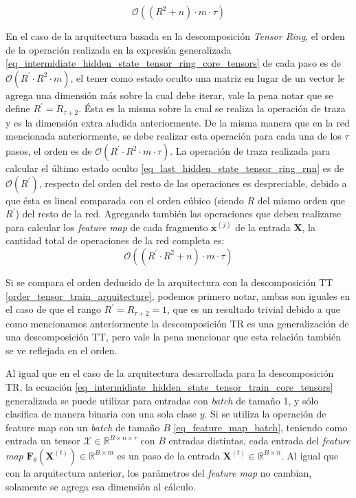 \documentclass[spanish]{article}
\theoremstyle{definition}
\theoremstyle{remark}
\numberwithin{equation}{section}
\numberwithin{equation}{section} %
\begin{document}
\begin{equation}
\label{order_tensor_train_arquitecture}
\mathcal{O}( (R^2 + n) \cdot m \cdot \tau)
\end{equation} \par
En el caso de la arquitectura  basada en la descomposición \textit{Tensor Ring}, el orden de la operación realizada en la expresión generalizada  \eqref{eq_intermidiate_hidden_state_tensor_ring_core_tensors}
de cada paso es de $\mathcal{O}(R^\prime \cdot R^2 \cdot m)$, el tener como estado oculto una matriz en lugar de un vector le agrega una dimensión más sobre la cual debe iterar, vale la pena notar que se define $R^\prime =R_{\tau+2}$. Ésta es la misma sobre la cual se realiza la operación de traza y es la dimensión extra aludida anteriormente. De la misma manera que en la red mencionada anteriormente, se debe realizar esta operación para cada una de los $\tau$ pasos, el orden es de  $\mathcal{O}(R^\prime \cdot R^2 \cdot m \cdot \tau)$. La operación de traza realizada para calcular el último estado oculto  \eqref{eq_last_hidden_state_tensor_ring_rnn} es de  $\mathcal{O}(R^\prime)$, respecto del orden del resto de las operaciones es despreciable, debido a que ésta es lineal comparada con el orden cúbico (siendo $R$ del mismo orden que $R^\prime$) del resto de la red. Agregando también las operaciones que deben realizarse para calcular los \textit{feature map} de cada fragmento $\boldsymbol{x}^{(j)}$ de la entrada $\boldsymbol{X}$, la cantidad total de operaciones de la red completa es:
\begin{equation}
\label{order_tensor_ring_arquitecture}
\mathcal{O}( (R^\prime \cdot R^2 + n) \cdot m \cdot \tau)
\end{equation} \par
Si se compara el orden deducido de la arquitectura con la descomposición TT \eqref{order_tensor_train_arquitecture}, podemos primero notar, ambas son iguales en el caso de que el rango $R^\prime=R_{\tau+2}=1$, que es un resultado trivial debido a que como mencionamos anteriormente la descomposición TR es una generalización de una descomposición TT, pero vale la pena mencionar que esta relación también se ve reflejada en el orden. \par
Al igual que en el caso de la arquitectura desarrollada para la descomposición TR, la ecuación \eqref{eq_intermidiate_hidden_state_tensor_train_core_tensors} generalizada se puede utilizar para entradas con \textit{batch} de tamaño 1, y sólo clasifica de manera binaria con una sola clase $y$. Si se utiliza la operación de feature map con un \textit{batch} de tamaño $B$ \eqref{eq_feature_map_batch}, teniendo como entrada  un tensor $\mathcal{X} \in \mathbb{R}^{B \times n \times \tau}$ con $B$ entradas distintas, cada entrada del \textit{feature map} $\boldsymbol{F}_\theta (\boldsymbol{X}^{(t)}) \in \mathbb{R}^{B \times m}$ es un paso de la entrada $\boldsymbol{X}^{(t)} \in \mathbb{R}^{B \times n}$. Al igual que con la arquitectura anterior, los parámetros del \textit{feature map} no cambian, solamente se agrega esa dimensión al cálculo. \par
\end{document}
